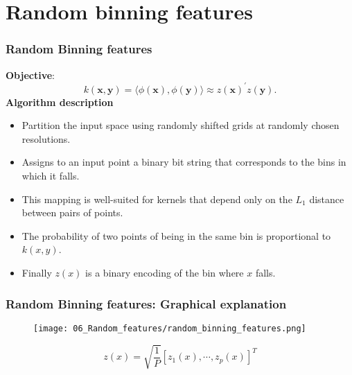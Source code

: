 \section{Random binning features}

\begin{frame}
    \frametitle{Random Binning features}
    \textbf{Objective}:
    \begin{equation}
        k(\mathbf{x},\mathbf{y}) = \langle \phi(\mathbf{x}), \phi(\mathbf{y}) \rangle \approx z(\mathbf{x})^\prime z(\mathbf{y}). 
      \end{equation}
    \textbf{Algorithm description}
    \begin{itemize}
        \item  Partition the input space using randomly shifted grids at randomly chosen
        resolutions.
        \item Assigns to an input point a binary bit string that corresponds to the bins in which it
        falls.
        \item This mapping is well-suited
        for kernels that depend only on the $L_1$ distance between pairs of points. 
        \item The probability of two points of being in the same bin is proportional to $k(x,y)$.
        \item Finally $z(x)$ is a binary encoding of the bin where $x$ falls.
    \end{itemize}
\end{frame}

\begin{frame}
    \frametitle{Random Binning features: Graphical explanation}
\begin{figure}[t]
    \texttt{[image: 06\_Random\_features/random\_binning\_features.png]}
    \centering
\end{figure}
    \begin{equation}
        z(x) = \sqrt{\frac{1}{P}}
        \left[
            z_1(x), \cdots, z_p(x)
        \right]^T
    \end{equation}
\end{frame}

